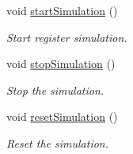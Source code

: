 \begin{CompactItemize}
void \hyperlink{group__dcsc__msg__buffer__access_g0adb3aacb8d7ad32ceabe66a9dcbb401}{start\-Simulation} ()
\begin{CompactList}\small\item\em Start register simulation. \item\end{CompactList}\item 
void \hyperlink{group__dcsc__msg__buffer__access_gd871881385919aff64a8b679984cd018}{stop\-Simulation} ()
\begin{CompactList}\small\item\em Stop the simulation. \item\end{CompactList}\item 
void \hyperlink{group__dcsc__msg__buffer__access_gb54d216419ff2c191363373bef5f9cfa}{reset\-Simulation} ()
\begin{CompactList}\small\item\em Reset the simulation. \item\end{CompactList}\end{CompactItemize}

